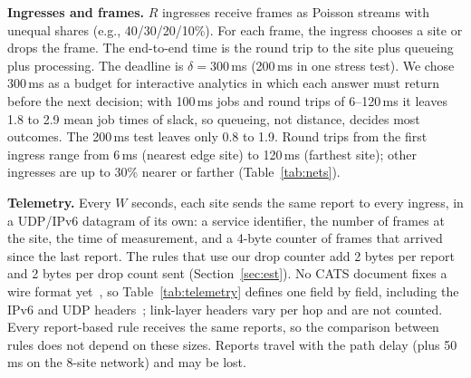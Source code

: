\documentclass[conference]{IEEEtran}
\begin{document}
\textbf{Ingresses and frames.} $R$ ingresses receive frames as Poisson streams with unequal shares (e.g., 40/30/20/10\%). For each frame, the ingress chooses a site or drops the frame. The end-to-end time is the round trip to the site plus queueing plus processing. The deadline is $\delta = 300$\,ms (200\,ms in one stress test). We chose 300\,ms as a budget for interactive analytics in which each answer must return before the next decision; with 100\,ms jobs and round trips of 6--120\,ms it leaves 1.8 to 2.9 mean job times of slack, so queueing, not distance, decides most outcomes. The 200\,ms test leaves only 0.8 to 1.9. Round trips from the first ingress range from 6\,ms (nearest edge site) to 120\,ms (farthest site); other ingresses are up to 30\% nearer or farther (Table~\ref{tab:nets}).

\textbf{Telemetry.} Every $W$ seconds, each site sends the same report to every ingress, in a UDP/IPv6 datagram of its own: a service identifier, the number of frames at the site, the time of measurement, and a 4-byte counter of frames that arrived since the last report. The rules that use our drop counter add 2 bytes per report and 2 bytes per drop count sent (Section~\ref{sec:est}). No CATS document fixes a wire format yet~\cite{catsmetrics}, so Table~\ref{tab:telemetry} defines one field by field, including the IPv6 and UDP headers~\cite{rfc8200,rfc768}; link-layer headers vary per hop and are not counted. Every report-based rule receives the same reports, so the comparison between rules does not depend on these sizes. Reports travel with the path delay (plus 50\,ms on the 8-site network) and may be lost.
\end{document}
